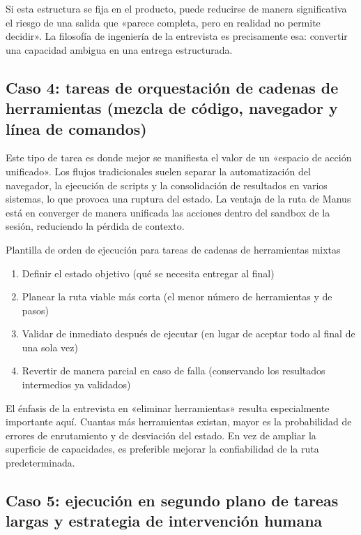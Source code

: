 \documentclass[a4paper]{article}
\begin{document}
Si esta estructura se fija en el producto, puede reducirse de manera significativa el riesgo de una salida que «parece completa, pero en realidad no permite decidir». La filosofía de ingeniería de la entrevista es precisamente esa: convertir una capacidad ambigua en una entrega estructurada.

\subsection{Caso 4: tareas de orquestación de cadenas de herramientas (mezcla de código, navegador y línea de comandos)}

Este tipo de tarea es donde mejor se manifiesta el valor de un «espacio de acción unificado». Los flujos tradicionales suelen separar la automatización del navegador, la ejecución de scripts y la consolidación de resultados en varios sistemas, lo que provoca una ruptura del estado. La ventaja de la ruta de Manus está en converger de manera unificada las acciones dentro del sandbox de la sesión, reduciendo la pérdida de contexto.

\begin{importantbox}{Plantilla de orden de ejecución para tareas de cadenas de herramientas mixtas}
\begin{enumerate}
    \item Definir el estado objetivo (qué se necesita entregar al final)
    \item Planear la ruta viable más corta (el menor número de herramientas y de pasos)
    \item Validar de inmediato después de ejecutar (en lugar de aceptar todo al final de una sola vez)
    \item Revertir de manera parcial en caso de falla (conservando los resultados intermedios ya validados)
\end{enumerate}
\end{importantbox}

El énfasis de la entrevista en «eliminar herramientas» resulta especialmente importante aquí. Cuantas más herramientas existan, mayor es la probabilidad de errores de enrutamiento y de desviación del estado. En vez de ampliar la superficie de capacidades, es preferible mejorar la confiabilidad de la ruta predeterminada.

\subsection{Caso 5: ejecución en segundo plano de tareas largas y estrategia de intervención humana}
\end{document}
